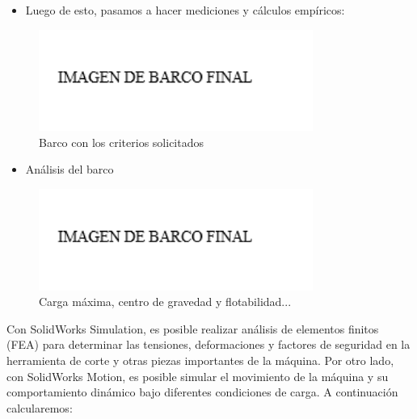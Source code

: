 \documentclass[a4paper,letterpaper]{article}
\begin{document}
\begin{itemize}
	\item Luego de esto, pasamos a hacer mediciones y cálculos empíricos:
\end{itemize}
\begin{figure}[H]
	\centering
	\includegraphics[width=0.8\textwidth]{imgbarcofinal.png}
	\caption{Barco con los criterios solicitados}
	\label{fig:imagen2}
\end{figure}
\begin{itemize}
	\item Análisis del barco
\end{itemize}
\begin{figure}[H]
	\centering
	\includegraphics[width=0.8\textwidth]{imgbarcofinal.png}
	\caption{Carga máxima, centro de gravedad y flotabilidad...}
	\label{fig:imagen3}
\end{figure}
\newpage
Con SolidWorks Simulation, es posible realizar análisis de elementos finitos (FEA) para determinar las tensiones, deformaciones y factores de seguridad en la herramienta de corte y otras piezas importantes de la máquina.
Por otro lado, con SolidWorks Motion, es posible simular el movimiento de la máquina y su comportamiento dinámico bajo diferentes condiciones de carga.
\newline
A continuación calcularemos:
\end{document}

